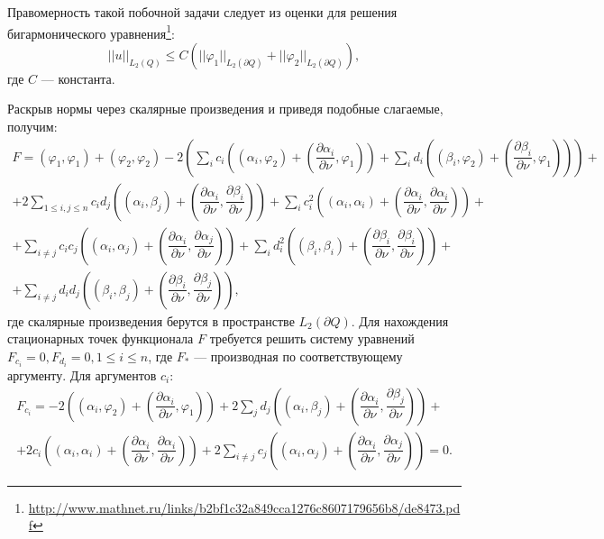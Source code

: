 \documentclass[a4paper, 12pt]{article}
\begin{document}
Правомерность такой побочной задачи следует из оценки для решения бигармонического уравнения\footnote{\url{http://www.mathnet.ru/links/b2bf1c32a849cca1276c8607179656b8/de8473.pdf}}:
\begin{equation*}
  ||u||_{L_2(Q)} \leq C \left(||\varphi_1||_{L_2(\partial Q)}+ ||\varphi_2||_{L_2(\partial Q)} \right),
\end{equation*}
где $C$ --- константа.

Раскрыв нормы через скалярные произведения и приведя подобные слагаемые, получим:
\begin{multline}
  F=(\varphi_1,\varphi_1)+(\varphi_2,\varphi_2) - 2 \left(\sum_i c_i \left((\alpha_i,\varphi_2)+\left(\dfrac{\partial \alpha_i}{\partial \nu},\varphi_1\right)  \right)  + \sum_i d_i \left((\beta_i,\varphi_2)+\left(\dfrac{\partial \beta_i}{\partial \nu},\varphi_1\right)  \right) \right)+\\
  +2\sum_{1 \leq i,j \leq n} c_i d_j \left((\alpha_i,\beta_j)+\left(\dfrac{\partial \alpha_i}{\partial \nu},\dfrac{\partial \beta_i}{\partial \nu}\right)  \right)+
  \sum_i c_i^2 \left(  (\alpha_i,\alpha_i)+\left(\dfrac{\partial \alpha_i}{\partial \nu},\dfrac{\partial \alpha_i}{\partial \nu}\right)  \right)+\\
  +\sum_{i \ne j} c_i c_j \left(  (\alpha_i,\alpha_j)+\left(\dfrac{\partial \alpha_i}{\partial \nu},\dfrac{\partial \alpha_j}{\partial \nu}\right)\right)+
  \sum_i d_i^2 \left(  (\beta_i,\beta_i)+\left(\dfrac{\partial \beta_i}{\partial \nu},\dfrac{\partial \beta_i}{\partial \nu}\right)  \right)+\\
  +\sum_{i \ne j} d_i d_j \left(  (\beta_i,\beta_j)+\left(\dfrac{\partial \beta_i}{\partial \nu},\dfrac{\partial \beta_j}{\partial \nu}\right)\right),
\label{func}
\end{multline}
где скалярные произведения берутся в пространстве $L_2(\partial Q)$.
Для нахождения стационарных точек функционала $F$ требуется решить систему уравнений $F_{c_i}=0, F_{d_i}=0, 1\leq i \leq n$, где
$F_*$ --- производная по соответствующему аргументу. Для аргументов $c_i$:
\begin{multline}
  F_{c_i}=-2\left((\alpha_i,\varphi_2)+\left( \dfrac{\partial \alpha_i}{\partial \nu},\varphi_1 \right)\right)+ 2 \sum_j d_j \left((\alpha_i,\beta_j)+\left( \dfrac{\partial \alpha_i}{\partial \nu},\dfrac{\partial \beta_j}{\partial \nu} \right)\right)+\\
  +2 c_i \left((\alpha_i,\alpha_i)+\left( \dfrac{\partial \alpha_i}{\partial \nu},\dfrac{\partial \alpha_i}{\partial \nu} \right)\right)+2\sum_{i \ne j} c_j \left((\alpha_i,\alpha_j)+\left( \dfrac{\partial \alpha_i}{\partial \nu},\dfrac{\partial \alpha_j}{\partial \nu} \right)\right)=0.
\end{multline}  
\end{document}
